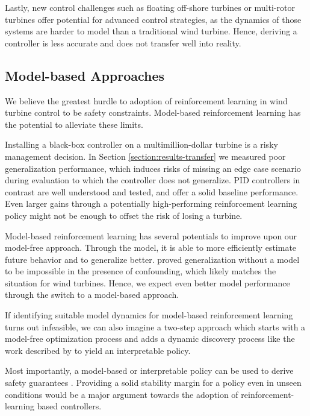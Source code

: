Lastly, new control challenges such as floating off-shore turbines or multi-rotor turbines offer potential for advanced control strategies, as the dynamics of those systems are harder to model than a traditional wind turbine. Hence, deriving a controller is less accurate and does not transfer well into reality.

\subsection{Model-based Approaches}

We believe the greatest hurdle to adoption of reinforcement learning in wind turbine control to be safety constraints. Model-based reinforcement learning has the potential to alleviate these limits.

Installing a black-box controller on a multimillion-dollar turbine is a risky management decision. In Section \ref{section:results-transfer} we measured poor generalization performance, which induces risks of missing an edge case scenario during evaluation to which the controller does not generalize. PID controllers in contrast are well understood and tested, and offer a solid baseline performance. Even larger gains through a potentially high-performing reinforcement learning policy might not be enough to offset the risk of losing a turbine.

Model-based reinforcement learning has several potentials to improve upon our model-free approach. Through the model, it is able to more efficiently estimate future behavior and to generalize better. \citet{pearlCausalInferenceStatistics2009} proved generalization without a model to be impossible in the presence of confounding, which likely matches the situation for wind turbines. Hence, we expect even better model performance through the switch to a model-based approach.

If identifying suitable model dynamics for model-based reinforcement learning turns out infeasible, we can also imagine a two-step approach which starts with a model-free optimization process and adds a dynamic discovery process like the work described by \citet{bruntonDiscoveringGoverningEquations2016} to yield an interpretable policy.

Most importantly, a model-based or interpretable policy can be used to derive safety guarantees \cite{berkenkampSafeModelbasedReinforcement2017}. Providing a solid stability margin for a policy even in unseen conditions would be a major argument towards the adoption of reinforcement-learning based controllers.

